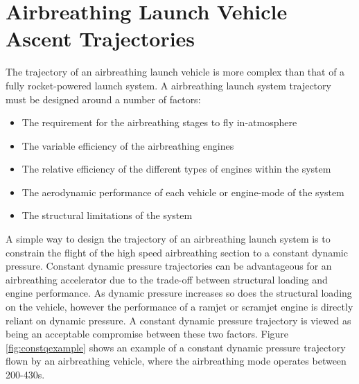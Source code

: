  


\section{Airbreathing Launch Vehicle Ascent Trajectories}

The trajectory of an airbreathing launch vehicle is more complex than that of a fully rocket-powered launch system. 
A airbreathing launch system trajectory must be designed around a number of factors:
\begin{itemize}
	\item The requirement for the airbreathing stages to fly in-atmosphere 
	\item The variable efficiency of the airbreathing engines
	\item The relative efficiency of the different types of engines within the system
	\item The aerodynamic performance of each vehicle or engine-mode of the system
	\item The structural limitations of the system
\end{itemize}

A simple way to design the trajectory of an airbreathing launch system is to constrain the flight of the high speed airbreathing section to a constant dynamic pressure\cite{Olds1998,Preller2015,Punnoose2007,Kanda1996,Young2006}. 
 Constant dynamic pressure trajectories can be advantageous for an airbreathing accelerator due to the trade-off between structural loading and engine performance\cite{Olds1998}. As dynamic pressure increases so does the structural loading on the vehicle, however the performance of a ramjet or scramjet engine is directly reliant on dynamic pressure\cite{Olds1998}. A constant dynamic pressure trajectory is viewed as being an acceptable compromise between these two factors. Figure \ref{fig:constqexample} shows an example of a constant dynamic pressure trajectory flown by an airbreathing vehicle, where the airbreathing mode operates between 200-430s. 

